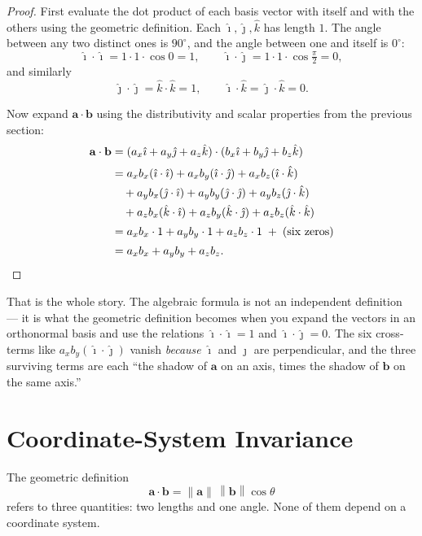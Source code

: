 \documentclass[11pt]{article}
\newcommand{\vect}[1]{\mathbf{#1}}
\newcommand{\ihat}{\hat{\imath}}
\newcommand{\jhat}{\hat{\jmath}}
\newcommand{\khat}{\hat{k}}
\newcommand{\norm}[1]{\left\lVert #1 \right\rVert}
\begin{document}
\begin{proof}
First evaluate the dot product of each basis vector with itself and with the others using the geometric definition. Each $\ihat,\jhat,\khat$ has length $1$. The angle between any two distinct ones is $90^\circ$, and the angle between one and itself is $0^\circ$:
\[
  \ihat\cdot\ihat = 1\cdot 1\cdot\cos 0 = 1,
  \qquad
  \ihat\cdot\jhat = 1\cdot 1\cdot\cos\tfrac{\pi}{2} = 0,
\]
and similarly
\[
  \jhat\cdot\jhat = \khat\cdot\khat = 1,
  \qquad
  \ihat\cdot\khat = \jhat\cdot\khat = 0.
\]

Now expand $\vect{a}\cdot\vect{b}$ using the distributivity and scalar properties from the previous section:
\begin{align*}
  \vect{a}\cdot\vect{b}
  &= (a_x\ihat + a_y\jhat + a_z\khat)\cdot(b_x\ihat + b_y\jhat + b_z\khat) \\[2pt]
  &= a_x b_x (\ihat\cdot\ihat) + a_x b_y (\ihat\cdot\jhat) + a_x b_z (\ihat\cdot\khat) \\
  &\quad + a_y b_x (\jhat\cdot\ihat) + a_y b_y (\jhat\cdot\jhat) + a_y b_z (\jhat\cdot\khat) \\
  &\quad + a_z b_x (\khat\cdot\ihat) + a_z b_y (\khat\cdot\jhat) + a_z b_z (\khat\cdot\khat) \\[2pt]
  &= a_x b_x\cdot 1 + a_y b_y\cdot 1 + a_z b_z\cdot 1 \;+\; (\text{six zeros}) \\[2pt]
  &= a_x b_x + a_y b_y + a_z b_z. \qedhere
\end{align*}
\end{proof}

That is the whole story. The algebraic formula is not an independent definition — it is what the geometric definition becomes when you expand the vectors in an orthonormal basis and use the relations $\ihat\cdot\ihat=1$ and $\ihat\cdot\jhat=0$. The six cross-terms like $a_x b_y(\ihat\cdot\jhat)$ vanish \emph{because} $\ihat$ and $\jhat$ are perpendicular, and the three surviving terms are each ``the shadow of $\vect{a}$ on an axis, times the shadow of $\vect{b}$ on the same axis.''

\section{Coordinate-System Invariance}

The geometric definition
\[
  \vect{a}\cdot\vect{b} = \norm{\vect{a}}\,\norm{\vect{b}}\cos\theta
\]
refers to three quantities: two lengths and one angle. None of them depend on a coordinate system.
\end{document}
